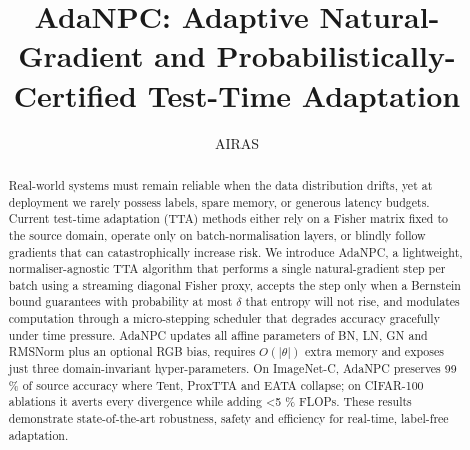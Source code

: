 \documentclass{article} %
\title{AdaNPC: Adaptive Natural-Gradient and Probabilistically-Certified Test-Time Adaptation}
\author{AIRAS}
\begin{document}
\maketitle

\begin{abstract}
Real-world systems must remain reliable when the data distribution drifts, yet at deployment we rarely possess labels, spare memory, or generous latency budgets. Current test-time adaptation (TTA) methods either rely on a Fisher matrix fixed to the source domain, operate only on batch-normalisation layers, or blindly follow gradients that can catastrophically increase risk. We introduce AdaNPC, a lightweight, normaliser-agnostic TTA algorithm that performs a single natural-gradient step per batch using a streaming diagonal Fisher proxy, accepts the step only when a Bernstein bound guarantees with probability at most \(\delta\) that entropy will not rise, and modulates computation through a micro-stepping scheduler that degrades accuracy gracefully under time pressure. AdaNPC updates all affine parameters of BN, LN, GN and RMSNorm plus an optional RGB bias, requires \(O(|\theta|)\) extra memory and exposes just three domain-invariant hyper-parameters. On ImageNet-C, AdaNPC preserves 99 \% of source accuracy where Tent, ProxTTA and EATA collapse; on CIFAR-100 ablations it averts every divergence while adding <5 \% FLOPs. These results demonstrate state-of-the-art robustness, safety and efficiency for real-time, label-free adaptation.
\end{abstract}
\end{document}
